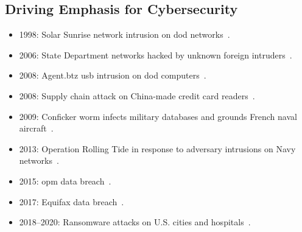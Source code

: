 \documentclass[../main.tex]{subfiles}
\begin{document}
\subsection{Driving Emphasis for Cybersecurity}
\begin{itemize}
  \item 1998: Solar Sunrise network intrusion on \ac{dod} networks~\autocite{edo-3-4-3-cybersecurity-awareness-2025}.
  \item 2006: State Department networks hacked by unknown foreign intruders~\autocite{edo-3-4-3-cybersecurity-awareness-2025}.
  \item 2008: Agent.btz \ac{usb} intrusion on \ac{dod} computers~\autocite{edo-3-4-3-cybersecurity-awareness-2025}.
  \item 2008: Supply chain attack on China-made credit card readers~\autocite{edo-3-4-3-cybersecurity-awareness-2025}.
  \item 2009: Conficker worm infects military databases and grounds French naval aircraft~\autocite{edo-3-4-3-cybersecurity-awareness-2025}.
  \item 2013: Operation Rolling Tide in response to adversary intrusions on Navy networks~\autocite{edo-3-4-3-cybersecurity-awareness-2025}.
  \item 2015: \ac{opm} data breach~\autocite{edo-3-4-3-cybersecurity-awareness-2025}.
  \item 2017: Equifax data breach~\autocite{edo-3-4-3-cybersecurity-awareness-2025}.
  \item 2018--2020: Ransomware attacks on U.S. cities and hospitals~\autocite{edo-3-4-3-cybersecurity-awareness-2025}.
\end{itemize}
\end{document}
